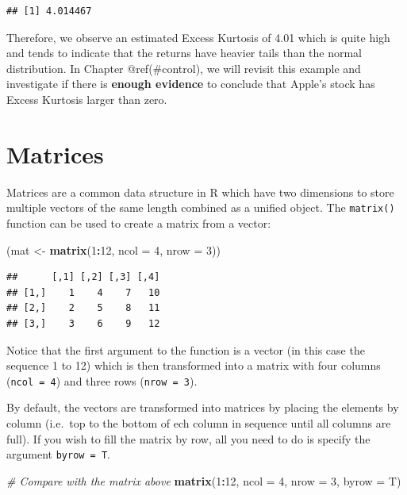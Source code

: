 \documentclass[12pt,]{krantz}
\newenvironment{Shaded}{\begin{snugshade}}{\end{snugshade}}
\newcommand{\KeywordTok}[1]{\textcolor[rgb]{0.27,0.27,0.27}{\textbf{#1}}}
\newcommand{\DataTypeTok}[1]{\textcolor[rgb]{0.27,0.27,0.27}{#1}}
\newcommand{\DecValTok}[1]{\textcolor[rgb]{0.06,0.06,0.06}{#1}}
\newcommand{\StringTok}[1]{\textcolor[rgb]{0.5,0.5,0.5}{#1}}
\newcommand{\CommentTok}[1]{\textcolor[rgb]{0.37,0.37,0.37}{\textit{#1}}}
\newcommand{\OperatorTok}[1]{\textcolor[rgb]{0.43,0.43,0.43}{\textbf{#1}}}
\newcommand{\NormalTok}[1]{#1}
\let\BeginKnitrBlock\begin \let\EndKnitrBlock\end
\begin{document}
\begin{verbatim}
## [1] 4.014467
\end{verbatim}

Therefore, we observe an estimated Excess Kurtosis of 4.01 which is
quite high and tends to indicate that the returns have heavier tails
than the normal distribution. In Chapter @ref(\#control), we will
revisit this example and investigate if there is \textbf{enough
evidence} to conclude that Apple's stock has Excess Kurtosis larger than
zero.

\section{Matrices}\label{matrices}

Matrices are a common data structure in R which have two dimensions to
store multiple vectors of the same length combined as a unified object.
The \texttt{matrix()} function can be used to create a matrix from a
vector:

\begin{Shaded}
\begin{Highlighting}[]
\NormalTok{(mat <-}\StringTok{ }\KeywordTok{matrix}\NormalTok{(}\DecValTok{1}\OperatorTok{:}\DecValTok{12}\NormalTok{, }\DataTypeTok{ncol =} \DecValTok{4}\NormalTok{,  }\DataTypeTok{nrow =} \DecValTok{3}\NormalTok{))}
\end{Highlighting}
\end{Shaded}

\begin{verbatim}
##      [,1] [,2] [,3] [,4]
## [1,]    1    4    7   10
## [2,]    2    5    8   11
## [3,]    3    6    9   12
\end{verbatim}

Notice that the first argument to the function is a vector (in this case
the sequence 1 to 12) which is then transformed into a matrix with four
columns (\texttt{ncol\ =\ 4}) and three rows (\texttt{nrow\ =\ 3}).

\BeginKnitrBlock{rmdtip}
By default, the vectors are transformed into matrices by placing the
elements by column (i.e.~top to the bottom of ech column in sequence
until all columns are full). If you wish to fill the matrix by row, all
you need to do is specify the argument \texttt{byrow\ =\ T}.
\EndKnitrBlock{rmdtip}

\begin{Shaded}
\begin{Highlighting}[]
\CommentTok{# Compare with the matrix above}
\KeywordTok{matrix}\NormalTok{(}\DecValTok{1}\OperatorTok{:}\DecValTok{12}\NormalTok{, }\DataTypeTok{ncol =} \DecValTok{4}\NormalTok{,  }\DataTypeTok{nrow =} \DecValTok{3}\NormalTok{, }\DataTypeTok{byrow =}\NormalTok{ T)}
\end{Highlighting}
\end{Shaded}
\end{document}
